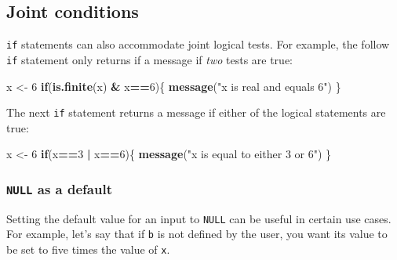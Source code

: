 \documentclass[
]{book}
\newenvironment{Shaded}{\begin{snugshade}}{\end{snugshade}}
\newcommand{\ControlFlowTok}[1]{\textcolor[rgb]{0.13,0.29,0.53}{\textbf{#1}}}
\newcommand{\DecValTok}[1]{\textcolor[rgb]{0.00,0.00,0.81}{#1}}
\newcommand{\KeywordTok}[1]{\textcolor[rgb]{0.13,0.29,0.53}{\textbf{#1}}}
\newcommand{\NormalTok}[1]{#1}
\newcommand{\OperatorTok}[1]{\textcolor[rgb]{0.81,0.36,0.00}{\textbf{#1}}}
\newcommand{\StringTok}[1]{\textcolor[rgb]{0.31,0.60,0.02}{#1}}
\begin{document}
\hypertarget{joint-conditions}{%
\subsection*{Joint conditions}\label{joint-conditions}}

\texttt{if} statements can also accommodate joint logical tests. For example, the follow \texttt{if} statement only returns if a message if \emph{two} tests are true:

\begin{Shaded}
\begin{Highlighting}[]
\NormalTok{x <-}\StringTok{ }\DecValTok{6}
\ControlFlowTok{if}\NormalTok{(}\KeywordTok{is.finite}\NormalTok{(x) }\OperatorTok{&}\StringTok{ }\NormalTok{x}\OperatorTok{==}\DecValTok{6}\NormalTok{)\{}
  \KeywordTok{message}\NormalTok{(}\StringTok{"x is real and equals 6"}\NormalTok{)}
\NormalTok{\}}
\end{Highlighting}
\end{Shaded}

The next \texttt{if} statement returns a message if either of the logical statements are true:

\begin{Shaded}
\begin{Highlighting}[]
\NormalTok{x <-}\StringTok{ }\DecValTok{6}
\ControlFlowTok{if}\NormalTok{(x}\OperatorTok{==}\DecValTok{3} \OperatorTok{|}\StringTok{ }\NormalTok{x}\OperatorTok{==}\DecValTok{6}\NormalTok{)\{}
  \KeywordTok{message}\NormalTok{(}\StringTok{"x is equal to either 3 or 6"}\NormalTok{)}
\NormalTok{\}}
\end{Highlighting}
\end{Shaded}

\hypertarget{null-as-a-default}{%
\subsubsection*{\texorpdfstring{\texttt{NULL} as a default}{NULL as a default}}\label{null-as-a-default}}

Setting the default value for an input to \texttt{NULL} can be useful in certain use cases. For example, let's say that if \texttt{b} is not defined by the user, you want its value to be set to five times the value of \texttt{x}.
\end{document}
